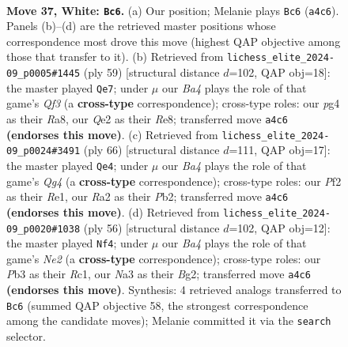 \documentclass[11pt]{article}
\begin{document}
\clearpage

\begin{figure}[p]\centering
\begin{subfigure}{0.46\textwidth}\centering
\resizebox{\linewidth}{!}{%
\newchessgame
\chessboard[
  setfen={r1b2r2/p1n2p1k/1p3Bp1/q2p4/B5pP/NP6/R1PNQP2/5RK1 w - - 0 37},
  showmover=false,
  pgfstyle=straightmove, color=movearrow, markmove={a4-c6}
]}
\caption{}
\end{subfigure}\hfill
\begin{subfigure}{0.46\textwidth}\centering
\resizebox{\linewidth}{!}{%
\newchessgame
\chessboard[
  setfen={r3rnk1/5ppp/1p3q2/pNb5/P7/2P3P1/1P4QP/2BR1R1K b - - 1 30},
  showmover=false,
  pgfstyle=straightmove, color=movearrow, markmove={f6-e7}
]}
\caption{}
\end{subfigure}
\\[4pt]
\begin{subfigure}{0.46\textwidth}\centering
\resizebox{\linewidth}{!}{%
\newchessgame
\chessboard[
  setfen={5r2/p3bq1k/1p2p1rp/2p1B3/P5Q1/2NP2P1/1P2RPK1/4R3 w - - 0 34},
  showmover=false,
  pgfstyle=straightmove, color=movearrow, markmove={g4-e4}
]}
\caption{}
\end{subfigure}\hfill
\begin{subfigure}{0.46\textwidth}\centering
\resizebox{\linewidth}{!}{%
\newchessgame
\chessboard[
  setfen={r3brk1/5ppp/q2P4/p1p1n3/Pp2P3/1Q4P1/4N1BP/2RR3K w - - 0 29},
  showmover=false,
  pgfstyle=straightmove, color=movearrow, markmove={e2-f4}
]}
\caption{}
\end{subfigure}
\caption{\textbf{Move 37, White: \texttt{Bc6}.} (a) Our position; Melanie plays \texttt{Bc6} (\texttt{a4c6}). Panels (b)--(d) are the retrieved master positions whose correspondence most drove this move (highest QAP objective among those that transfer to it). (b) Retrieved from \texttt{lichess\_elite\_2024-09\_p0005\#1445} (ply 59) [structural distance $d$=102, QAP obj=18]: the master played \texttt{Qe7}; under $\mu$ our \emph{Ba4} plays the role of that game's \emph{Qf3} (a \textbf{cross-type} correspondence); cross-type roles: our \emph{p}g4 as their \emph{R}a8, our \emph{Q}e2 as their \emph{R}e8; transferred move \texttt{a4c6} \textbf{(endorses this move)}. (c) Retrieved from \texttt{lichess\_elite\_2024-09\_p0024\#3491} (ply 66) [structural distance $d$=111, QAP obj=17]: the master played \texttt{Qe4}; under $\mu$ our \emph{Ba4} plays the role of that game's \emph{Qg4} (a \textbf{cross-type} correspondence); cross-type roles: our \emph{P}f2 as their \emph{R}e1, our \emph{R}a2 as their \emph{P}b2; transferred move \texttt{a4c6} \textbf{(endorses this move)}. (d) Retrieved from \texttt{lichess\_elite\_2024-09\_p0020\#1038} (ply 56) [structural distance $d$=102, QAP obj=12]: the master played \texttt{Nf4}; under $\mu$ our \emph{Ba4} plays the role of that game's \emph{Ne2} (a \textbf{cross-type} correspondence); cross-type roles: our \emph{P}b3 as their \emph{R}c1, our \emph{N}a3 as their \emph{B}g2; transferred move \texttt{a4c6} \textbf{(endorses this move)}. Synthesis: 4 retrieved analogs transferred to \texttt{Bc6} (summed QAP objective 58, the strongest correspondence among the candidate moves); Melanie committed it via the \texttt{search} selector.}

\end{figure}
\end{document}
